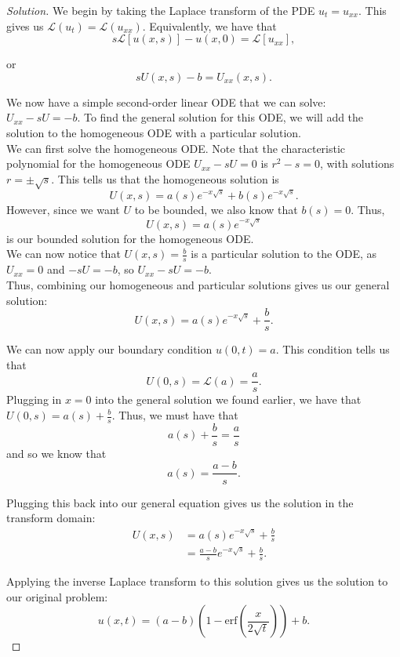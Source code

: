 \documentclass[11pt]{article}
\newenvironment{solution}
  {\renewcommand\qedsymbol{$\blacksquare$}\begin{proof}[Solution]}
  {\end{proof}}
\begin{document}
\begin{solution}
We begin by taking the Laplace transform of the PDE $u_t = u_{xx}.$ This gives us $ \mathcal{L}(u_t) = \mathcal{L}(u_{xx}).$ Equivalently, we have that
\[ s\mathcal{L}[u(x, s)] - u(x, 0) = \mathcal{L}[u_{xx}],\]

or \[sU(x, s) - b = U_{xx}(x, s).\]

We now have a simple second-order linear ODE that we can solve: $U_{xx} - sU = -b.$ To find the general solution for this ODE, we will add the solution to the homogeneous ODE with a particular solution. \\

We can first solve the homogeneous ODE. Note that the characteristic polynomial for the homogeneous ODE  $U_{xx} - sU = 0$ is $r^2 - s =0$, with solutions $r = \pm \sqrt{s}.$ This tells us that the homogeneous solution is \[U(x, s) = a(s)e^{-x\sqrt{s}} + b(s)e^{-x\sqrt{s}}.\]
However, since we want $U$ to be bounded, we also know that $b(s) = 0$. Thus, \[U(x, s) = a(s)e^{-x\sqrt{s}}\] is our bounded solution for the homogeneous ODE. \\

We can now notice that $U(x, s) = \frac{b}{s}$ is a particular solution to the ODE, as $U_{xx} = 0$ and $-sU = -b$, so $U_{xx} - sU = -b.$ \\

Thus, combining our homogeneous and particular solutions gives us our general solution:
\[ U(x, s) = a(s)e^{-x\sqrt{s}} + \frac{b}{s}. \]

We can now apply our boundary condition $u(0, t) = a.$ This condition tells us that \[U(0, s) = \mathcal{L}(a) = \frac{a}{s}.\]
Plugging in $x=0$ into the general solution we found earlier, we have that $U(0, s) = a(s) + \frac{b}{s}$. Thus, we must have that
\[a(s) + \frac{b}{s} = \frac{a}{s} \]
and so we know that \[a(s) = \frac{a-b}{s}.\]

Plugging this back into our general equation gives us the solution in the transform domain:
\begin{align*} U(x, s) &= a(s)e^{-x\sqrt{s}} + \frac{b}{s} \\ &= \frac{a-b}{s}e^{-x\sqrt{s}} + \frac{b}{s}.\end{align*}

Applying the inverse Laplace transform to this solution gives us the solution to our original problem:
\[\boxed{u(x, t) = (a-b)\left( 1 - \mathrm{erf}\left( \frac{x}{2\sqrt{t}}\right)\right) + b}.\]
\end{solution}
\end{document}
